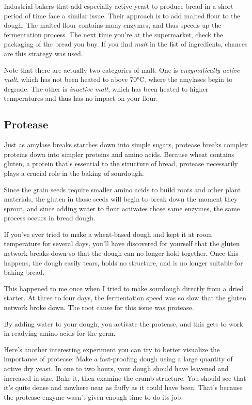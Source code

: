Industrial bakers that add especially active yeast to produce bread in a short
period of time face a similar issue. Their approach is to add malted flour to
the dough. The malted flour contains many enzymes, and thus speeds up the
fermentation process. The next time you're at the supermarket, check the
packaging of the bread you buy. If you find {\it malt} in the list of
ingredients, chances are this strategy was used.

Note that there are actually two categories of malt. One is {\it enzymatically
active malt}, which has not been heated to above 70°C, where the amylases begin
to degrade. The other is {\it inactive malt}, which has been heated to higher
temperatures and thus has no impact on your flour.

\subsection{Protease}

Just as amylase breaks starches down into simple sugars, protease breaks
complex proteins down into simpler proteins and amino acids. Because wheat
contains gluten, a protein that's essential to the structure of bread,
protease necessarily plays a crucial role in the baking of sourdough.

Since the grain seeds require smaller amino acids to build roots and other
plant materials, the gluten in those seeds will begin to break down the moment
they sprout, and since adding water to flour activates those same enzymes,
the same process occurs in bread dough.

If you've ever tried to make a wheat-based dough and kept it at room
temperature for several days, you'll have discovered for yourself that the
gluten network breaks down so that the dough can no longer hold together. Once
this happens, the dough easily tears, holds no structure, and is no
longer suitable for baking bread.

This happened to me once when I tried to make sourdough directly from a dried
starter. At three to four days, the fermentation speed was so slow that the
gluten network broke down. The root cause for this issue was protease.

By adding water to your dough, you activate the protease, and this gets to work
in readying amino acids for the germ.

Here's another interesting experiment you can try to better visualize the
importance of protease: Make a fast-proofing dough using a large quantity
of active dry yeast. In one to two hours, your dough should have leavened and
increased in size. Bake it, then examine the crumb structure. You should see
that it's quite dense and nowhere near as fluffy as it could have been. That's
because the protease enzyme wasn't given enough time to do its job.

